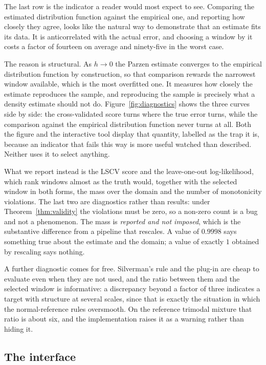 \documentclass[11pt]{article}
\begin{document}
The last row is the indicator a reader would most expect to see. Comparing the estimated
distribution function against the empirical one, and reporting how closely they agree, looks
like the natural way to demonstrate that an estimate fits its data. It is anticorrelated with the actual error, and choosing a window by
it costs a factor of fourteen on average and ninety-five in the worst case.

The reason is structural. As $h \to 0$ the Parzen estimate converges to the empirical
distribution function by construction, so that comparison rewards the narrowest window
available, which is the most overfitted one. It measures how closely the estimate reproduces
the sample, and reproducing the sample is precisely what a density estimate should not do.
Figure~\ref{fig:diagnostics} shows the three curves side by side: the cross-validated score
turns where the true error turns, while the comparison against the empirical distribution
function never turns at all. Both the figure and the interactive tool display that quantity,
labelled as the trap it is, because an indicator that fails this way is more useful watched
than described. Neither uses it to select anything.

What we report instead is the LSCV score and the leave-one-out log-likelihood, which rank
windows almost as the truth would, together with the selected window in both forms, the mass
over the domain and the number of monotonicity violations. The last two are diagnostics rather
than results: under Theorem~\ref{thm:validity} the violations must be zero, so a non-zero
count is a bug and not a phenomenon. The mass is \emph{reported and not imposed}, which is the
substantive difference from a pipeline that rescales. A value of $0.9998$ says something true
about the estimate and the domain; a value of exactly $1$ obtained by rescaling says nothing.

A further diagnostic comes for free. Silverman's rule and the plug-in are cheap to evaluate
even when they are not used, and the ratio between them and the selected window is
informative: a discrepancy beyond a factor of three indicates a target with structure at
several scales, since that is exactly the situation in which the normal-reference rules
oversmooth. On the reference trimodal mixture that ratio is about six, and the implementation
raises it as a warning rather than hiding it.

\subsection{The interface}
\end{document}
